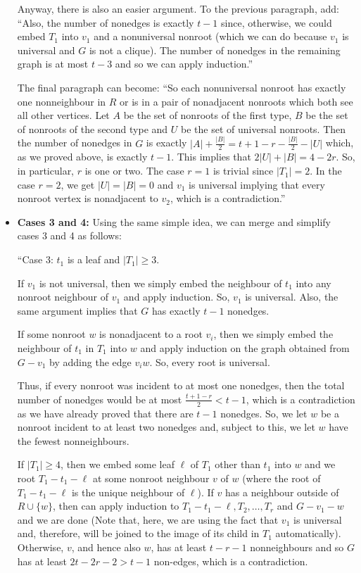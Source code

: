 \documentclass[11 pt]{article}
\theoremstyle{definition}
\theoremstyle{case}
\numberwithin{equation}{section}
\begin{document}
\begin{itemize}
Anyway, there is also an easier argument. To the previous paragraph, add: ``Also, the number of nonedges is exactly $t-1$ since, otherwise, we could embed $T_1$ into $v_1$ and a nonuniversal nonroot (which we can do because $v_1$ is universal and $G$ is not a clique). The number of nonedges in the remaining graph is at most $t-3$ and so we can apply induction.''

The final paragraph can become: ``So each nonuniversal nonroot has exactly one nonneighbour in $R$ or is in a pair of nonadjacent nonroots which both see all other vertices. Let $A$ be the set of nonroots of the first type, $B$ be the set of nonroots of the second type and $U$ be the set of universal nonroots. Then the number of nonedges in $G$ is exactly $|A| + \frac{|B|}{2} = t+1-r - \frac{|B|}{2} - |U|$ which, as we proved above, is exactly $t-1$. This implies that $2|U| + |B| = 4-2r$. So, in particular, $r$ is one or two. The case $r=1$ is trivial since $|T_1|=2$. In the case $r=2$, we get $|U|=|B|=0$ and $v_1$ is universal implying that every nonroot vertex is nonadjacent to $v_2$, which is a contradiction.''
\item \textbf{Cases 3 and 4:} Using the same simple idea, we can merge and simplify cases 3 and 4 as follows:

``Case 3: $t_1$ is a leaf and $|T_1|\geq3$.

If $v_1$ is not universal, then we simply embed the neighbour of $t_1$ into any nonroot neighbour of $v_1$ and apply induction. So, $v_1$ is universal. Also, the same argument implies that $G$ has exactly $t-1$ nonedges.

If some nonroot $w$ is nonadjacent to a root $v_i$, then we simply embed the neighbour of $t_1$ in $T_1$ into $w$ and apply induction on the graph obtained from $G-v_1$ by adding the edge $v_iw$. So, every root is universal. 

Thus, if every nonroot was incident to at most one nonedges, then the total number of nonedges would be at most $\frac{t+1-r}{2}< t-1$, which is a contradiction as we have already proved that there are $t-1$ nonedges. So, we let $w$ be a nonroot incident to at least two nonedges and, subject to this, we let $w$ have the fewest nonneighbours. 

If $|T_1|\geq 4$, then we embed some leaf $\ell$ of $T_1$ other than $t_1$ into $w$ and we root $T_1-t_1-\ell$ at some nonroot neighbour $v$ of $w$ (where the root of $T_1-t_1-\ell$ is the unique neighbour of $\ell$). If $v$ has a neighbour outside of $R\cup\{w\}$, then can apply induction to $T_1-t_1-\ell,T_2,\dots,T_r$ and $G-v_1-w$ and we are done (Note that, here, we are using the fact that $v_1$ is universal and, therefore, will be joined to the image of its child in $T_1$ automatically). Otherwise, $v$, and hence also $w$, has at least $t-r-1$ nonneighbours and so $G$ has at least $2t-2r-2 > t-1$ non-edges, which is a contradiction. 


\end{itemize}
\end{document}
